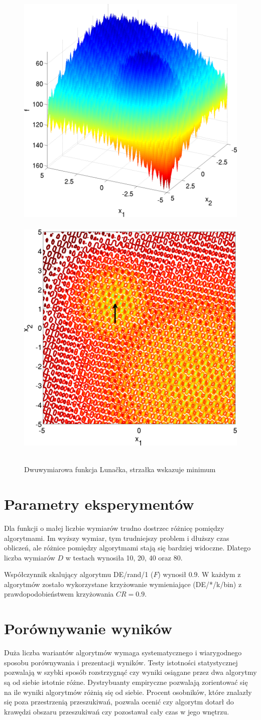 \documentclass[a4paper,onecolumn,oneside,12pt,wide,floatssmall]{mwrep}
\theoremstyle{definition}
\theoremstyle{plain}%
\theoremstyle{remark}
\begin{document}
\begin{figure}[H]
\centering
\mbox{
\includegraphics[width=.45\textwidth]{img/24.png} \quad
\includegraphics[width=.45\textwidth]{img/24a.png} 
}
\caption{Dwuwymiarowa funkcja Lunačka, strzałka wskazuje minimum \cite{noiseless}}
\end{figure}

\section{Parametry eksperymentów}

Dla funkcji o małej liczbie wymiarów trudno dostrzec różnicę pomiędzy algorytmami. Im wyższy wymiar,
tym trudniejszy problem i dłuższy czas obliczeń, ale różnice pomiędzy algorytmami stają się bardziej 
widoczne. Dlatego liczba wymiarów $D$ w testach wynosiła 10, 20, 40 oraz 80. 

Współczynnik skalujący algorytmu DE/rand/1 ($F$) wynosił $0.9$. 
W każdym z algorytmów zostało wykorzystane krzyżowanie wymieniające (DE/*/k/bin) z
prawdopodobieństwem krzyżowania $CR = 0.9$.

\section{Porównywanie wyników}

Duża liczba wariantów algorytmów wymaga systematycznego i wiarygodnego sposobu porównywania
i prezentacji wyników. Testy istotności statystycznej pozwalają w szybki sposób rozstrzygnąć czy 
wyniki osiągane przez dwa algorytmy są od siebie istotnie różne. Dystrybuanty empiryczne
pozwalają zorientować się na ile wyniki algorytmów różnią się od siebie. Procent osobników, które
znalazły się poza przestrzenią przeszukiwań, pozwala ocenić czy algorytm dotarł do krawędzi
obszaru przeszukiwań czy pozostawał cały czas w jego wnętrzu.
\end{document}
